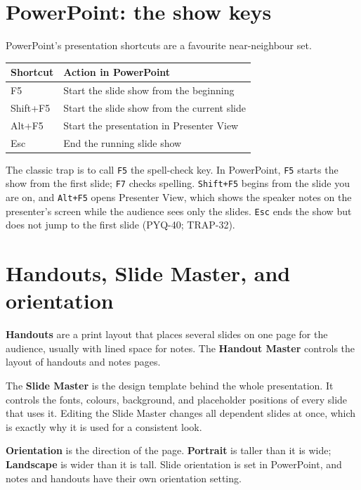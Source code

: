 \section{PowerPoint: the show keys}
PowerPoint's presentation shortcuts are a favourite near-neighbour set.

\begin{center}
\begin{tabular}{p{}p{}}
\toprule
\textbf{Shortcut} & \textbf{Action in PowerPoint} \\
\midrule
F5 & Start the slide show from the beginning \\
Shift+F5 & Start the slide show from the current slide \\
Alt+F5 & Start the presentation in Presenter View \\
Esc & End the running slide show \\
\bottomrule
\end{tabular}
\end{center}

The classic trap is to call \texttt{F5} the spell-check key. In PowerPoint,
\texttt{F5} starts the show from the first slide; \texttt{F7} checks
spelling. \texttt{Shift+F5} begins from the slide you are on, and
\texttt{Alt+F5} opens Presenter View, which shows the speaker notes on the
presenter's screen while the audience sees only the slides. \texttt{Esc} ends
the show but does not jump to the first slide (PYQ-40; TRAP-32).

\section{Handouts, Slide Master, and orientation}
\textbf{Handouts} are a print layout that places several slides on one page
for the audience, usually with lined space for notes. The \textbf{Handout
Master} controls the layout of handouts and notes pages.

The \textbf{Slide Master} is the design template behind the whole
presentation. It controls the fonts, colours, background, and placeholder
positions of every slide that uses it. Editing the Slide Master changes all
dependent slides at once, which is exactly why it is used for a consistent
look.

\textbf{Orientation} is the direction of the page. \textbf{Portrait} is taller
than it is wide; \textbf{Landscape} is wider than it is tall. Slide
orientation is set in PowerPoint, and notes and handouts have their own
orientation setting.

